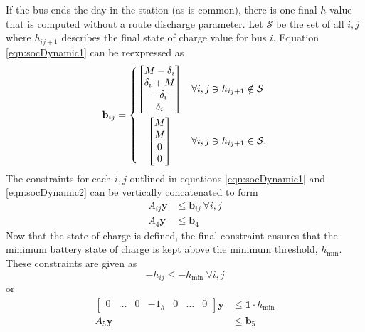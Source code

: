 If the bus ends the day in the station (as is common), there is one final $h$ value that is computed without a route discharge parameter. Let $\mathcal{S}$ be the set of all $i,j$ where $h_{ij+1}$ describes the final state of charge value for bus $i$. Equation \ref{eqn:socDynamic1} can be reexpressed as 
\begin{equation}\label{eqn:socDynamic2} 
	\mathbf{b}_{ij} = 
	\begin{dcases}
		\begin{bmatrix} M -\delta_i \\
			         \delta_i + M \\
		                -\delta_i     \\
		                 \delta_i 
		\end{bmatrix} & \forall i,j \ni h_{ij+1} \notin \mathcal{S} \\
		\omit \hfil$\begin{bmatrix} M \\
		                M \\
		                  0 \\
		                  0 
		\end{bmatrix}$\hfil & \forall i,j \ni h_{ij+1} \in \mathcal{S}.
	\end{dcases}
\end{equation}
The constraints for each $i,j$ outlined in equations \ref{eqn:socDynamic1} and \ref{eqn:socDynamic2} can be vertically concatenated to form
\begin{equation}\label{eqn:socDynamic3} \begin{aligned}
	A_{ij}\mathbf{y} &\le \mathbf{b}_{ij} \ \forall i,j \\
	A_4\mathbf{y} &\le \mathbf{b}_4
\end{aligned} \end{equation}
Now that the state of charge is defined, the final constraint ensures that the minimum battery state of charge is kept above the minimum threshold, $h_{\text{min}}$. These constraints are given as
\begin{equation}
	-h_{ij} \le -h_{\text{min}} \ \forall i,j
\end{equation}
or 
\begin{equation} \begin{aligned}
	\begin{bmatrix}0 & \hdots & 0 & -1_{h} & 0 & \hdots & 0\end{bmatrix} \mathbf{y} &\le \mathbf{1}\cdot h_{\text{min}}\\ 
		A_5\mathbf{y} &\le \mathbf{b}_5
\end{aligned} \end{equation}
